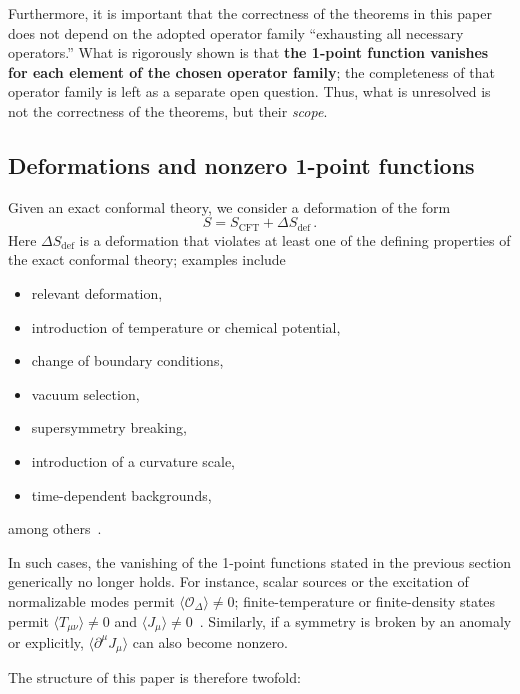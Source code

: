 \documentclass[
  aps,
  prd,
  preprint,
  groupedaddress,
  nofootinbib,
  longbibliography
]{revtex4-2}
\theoremstyle{remark}
\begin{document}
Furthermore, it is important that the correctness of the
theorems in this paper does not depend on the adopted operator
family ``exhausting all necessary operators.''
What is rigorously shown is that \textbf{the 1-point function
vanishes for each element of the chosen operator family};
the completeness of that operator family is left as a separate
open question.
Thus, what is unresolved is not the correctness of the
theorems, but their \emph{scope}.

\subsection{Deformations and nonzero 1-point functions}\label{subsec:1-6}

Given an exact conformal theory, we consider a deformation
of the form
\begin{equation}\label{eq:deformation}
  S = S_{\mathrm{CFT}} + \Delta S_{\mathrm{def}}\,.
\end{equation}
Here $\Delta S_{\mathrm{def}}$ is a deformation that violates
at least one of the defining properties of the exact conformal
theory; examples include

\begin{itemize}
\item relevant deformation,
\item introduction of temperature or chemical potential,
\item change of boundary conditions,
\item vacuum selection,
\item supersymmetry breaking,
\item introduction of a curvature scale,
\item time-dependent backgrounds,
\end{itemize}
among
others~\cite{ref4,ref7,ref9,ref10,ref11,ref12,ref17,ref19,ref20,ref21,ref22,ref23,ref24,ref25,ref26,ref27}.

In such cases, the vanishing of the 1-point functions stated
in the previous section generically no longer holds.
For instance, scalar sources or the excitation of normalizable
modes permit $\langle\mathcal{O}_\Delta\rangle\neq 0$;
finite-temperature or finite-density states permit
$\langle T_{\mu\nu}\rangle\neq 0$ and
$\langle J_\mu\rangle\neq 0$~\cite{ref9,ref10,ref11,ref12}.
Similarly, if a symmetry is broken by an anomaly or explicitly,
$\langle\partial^\mu J_\mu\rangle$ can also become nonzero.

The structure of this paper is therefore twofold:
\end{document}
